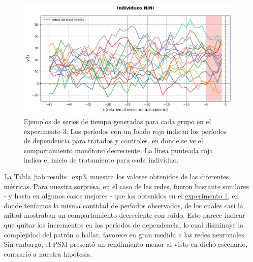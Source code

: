 \documentclass[../../main.tex]{subfiles}
\begin{document}
\begin{figure}[ht]
    \begin{minipage}{0.6\textwidth}
        \centering
        \includegraphics[scale=0.3]{figs/Exp3/ninis_sim63.png}
    \end{minipage}
    \caption{Ejemplos de series de tiempo generadas para cada grupo en el experimento 3.
    Los períodos con un fondo rojo indican los períodos de dependencia para tratados y
    controles, en donde se ve el comportamiento monótono decreciente. La línea
    punteada roja indica el inicio de tratamiento para cada individuo.}
    \label{fig:time_series_exp3}
\end{figure}

La Tabla \ref{tab:results_exp3} muestra los valores obtenidos de las diferentes métricas.
Para nuestra sorpresa, en el caso de las redes, fueron bastante similares - y hasta en
algunos casos mejores - que los obtenidos en el \hyperref[sec:exp1]{experimento 1}, en
donde teníamos la misma cantidad de períodos observados, de los cuales casi la mitad
mostraban un compartamiento decreciente con ruido. Esto parece indicar que quitar los
incrementos en los períodos de dependencia, lo cual disminuye la complejidad del patrón a
hallar, favorece en gran medida a las redes neuronales. Sin embargo, el PSM presentó un
rendimiento menor al visto en dicho escenario, contrario a nuestra hipótesis.
\end{document}
